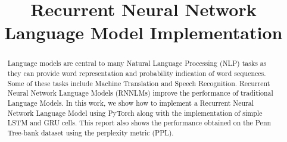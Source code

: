 \documentclass[conference]{IEEEtran}
\begin{document}
\title{Recurrent Neural Network Language Model Implementation\\
}

\author{
}

\maketitle

\begin{abstract}

Language models are central to many Natural Language Processing (NLP) tasks as they can 
provide word representation and probability indication of word sequences. Some of these 
tasks include Machine Translation and Speech Recognition. Recurrent Neural Network 
Language Models (RNNLMs) improve the performance of traditional Language Models. In this 
work, we show how to implement a Recurrent Neural Network Language Model using PyTorch 
along with the implementation of simple LSTM and GRU cells. This report also shows the 
performance obtained on the Penn Tree-bank dataset using the perplexity metric (PPL).

\end{abstract}







% 
% 
% 
% 

% 





\end{document}
